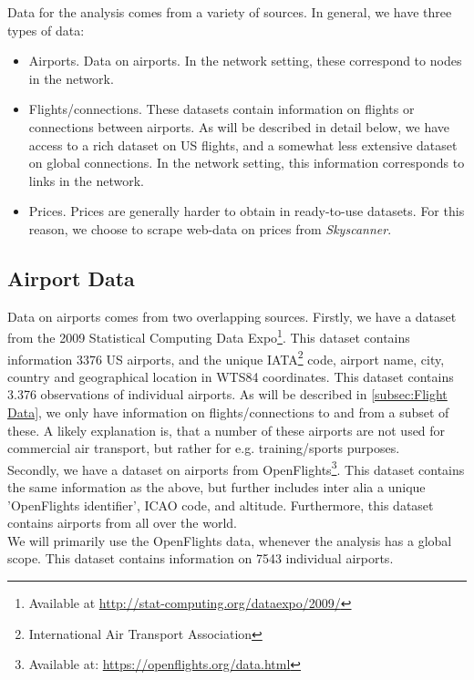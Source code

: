 \label{sec:data}
Data for the analysis comes from a variety of sources. 
In general, we have three types of data: 
\begin{itemize}
    \item Airports. Data on airports. In the network setting, these correspond to nodes in the network.
    \item Flights/connections. These datasets contain information on flights or connections between airports. As will be described in detail below, we have access to a rich dataset on US flights, and a somewhat less extensive dataset on global connections. In the network setting, this information corresponds to links in the network.  
    \item Prices. Prices are generally harder to obtain in ready-to-use datasets. For this reason, we choose to scrape web-data on prices from \textit{Skyscanner}.
\end{itemize}

\subsection{Airport Data}
Data on airports comes from two overlapping sources. Firstly, we have a dataset from the 2009 Statistical Computing Data Expo\footnote{Available at \url{http://stat-computing.org/dataexpo/2009/}}. This dataset contains information 3376 US airports, and the unique IATA\footnote{International Air Transport Association} code, airport name, city, country and geographical location in WTS84 coordinates. This dataset contains 3.376 observations of individual airports. As will be described in \ref{subsec:Flight Data}, we only have information on flights/connections to and from a subset of these. A likely explanation is, that a number of these airports are not used for commercial air transport, but rather for e.g. training/sports purposes.\\
Secondly, we have a dataset on airports from OpenFlights\footnote{Available at: \url{https://openflights.org/data.html}}. This dataset contains the same information as the above, but further includes inter alia a unique 'OpenFlights identifier', ICAO code, and altitude. Furthermore, this dataset contains airports from all over the world. \\
We will primarily use the OpenFlights data, whenever the analysis has a global scope. This dataset contains information on 7543 individual airports. 

